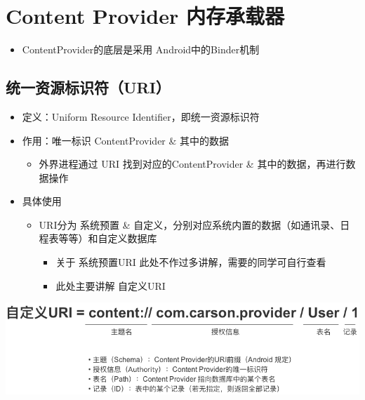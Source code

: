 \documentclass[9pt, b5paaper]{book}
\begin{document}
\chapter{Content Provider 内存承载器}
\label{sec-5}
\begin{itemize}
\item ContentProvider的底层是采用 Android中的Binder机制
\end{itemize}
\section{统一资源标识符（URI）}
\label{sec-5-1}
\begin{itemize}
\item 定义：Uniform Resource Identifier，即统一资源标识符
\item 作用：唯一标识 ContentProvider \& 其中的数据
\begin{itemize}
\item 外界进程通过 URI 找到对应的ContentProvider \& 其中的数据，再进行数据操作
\end{itemize}
\item 具体使用
\begin{itemize}
\item URI分为 系统预置 \& 自定义，分别对应系统内置的数据（如通讯录、日程表等等）和自定义数据库
\begin{itemize}
\item 关于 系统预置URI 此处不作过多讲解，需要的同学可自行查看
\item 此处主要讲解 自定义URI
\end{itemize}
\end{itemize}
\end{itemize}

\includegraphics[width=.9\linewidth]{./pic/uri.png}
\end{document}
